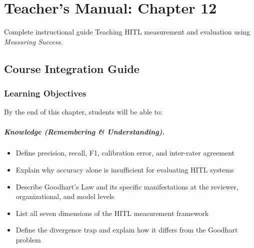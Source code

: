 
\chapter{Teacher's Manual: Chapter 12}
\label{ch:teacher-ch12}

\begin{chapterquote}{Complete instructional guide}
Teaching HITL measurement and evaluation using \emph{Measuring Success}.
\end{chapterquote}

\section{Course Integration Guide}

\subsection{Learning Objectives}

By the end of this chapter, students will be able to:

\paragraph{Knowledge (Remembering \& Understanding).}
\begin{itemize}
    \item Define precision, recall, F1, calibration error, and inter-rater agreement
    \item Explain why accuracy alone is insufficient for evaluating HITL systems
    \item Describe Goodhart's Law and its specific manifestations at the reviewer, organizational, and model levels
    \item List all seven dimensions of the HITL measurement framework
    \item Define the divergence trap and explain how it differs from the Goodhart problem
\end{itemize}

